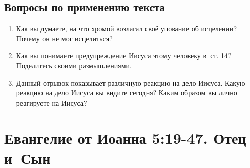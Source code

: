 \documentclass[a4paper,12pt]{article}
\begin{document}
\subsection*{Вопросы по применению текста} 
\begin{enumerate}
    \item Как вы думаете, на что хромой возлагал своё упование об исцелении? Почему он не мог исцелиться?
    
    \myline
    
    \myline
    \item Как вы понимаете предупреждение Иисуса этому человеку в~ст. 14? Поделитесь своими размышлениями.
    
    \myline
    
    \myline
    \item Данный отрывок показывает различную реакцию на дело Иисуса. Какую реакцию на дело Иисуса вы видите сегодня? Каким образом вы лично реагируете на Иисуса?
    
    \myline
    
    \myline
\end{enumerate}



\section{Евангелие от Иоанна 5:19-47. Отец и~Сын}
\end{document}
